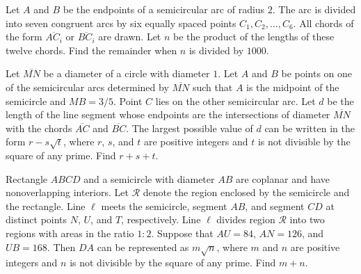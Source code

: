 %	












\begin{question}[name={2009 AIME II, \href{https://artofproblemsolving.com/community/c4p1455385}{Problem 13}}]
	Let $ A$ and $ B$ be the endpoints of a semicircular arc of radius $ 2$. The arc is divided into seven congruent arcs by six equally spaced points $ C_1,C_2,\ldots,C_6$. All chords of the form $ \overline{AC_i}$ or $ \overline{BC_i}$ are drawn. Let $ n$ be the product of the lengths of these twelve chords. Find the remainder when $ n$ is divided by $1000$.
\end{question}


%	














\begin{question}[name={2009 AIME II, \href{https://artofproblemsolving.com/community/c4p1455383}{Problem 15}}]
	Let $ \overline{MN}$ be a diameter of a circle with diameter $ 1$. Let $ A$ and $ B$ be points on one of the semicircular arcs determined by $ \overline{MN}$ such that $ A$ is the midpoint of the semicircle and $ MB=3/5$. Point $ C$ lies on the other semicircular arc. Let $ d$ be the length of the line segment whose endpoints are the intersections of diameter $ \overline{MN}$ with the chords $ \overline{AC}$ and $ \overline{BC}$. The largest possible value of $ d$ can be written in the form $ r-s\sqrt{t}$, where $ r$, $ s$, and $ t$ are positive integers and $ t$ is not divisible by the square of any prime. Find $r+s+t$.
\end{question}








\begin{question}[name={2010 AIME I, \href{https://artofproblemsolving.com/community/c4p1813791}{Problem 13}}]
	Rectangle $ ABCD$ and a semicircle with diameter $ AB$ are coplanar and have nonoverlapping interiors. Let $ \mathcal{R}$ denote the region enclosed by the semicircle and the rectangle. Line $ \ell$ meets the semicircle, segment $ AB$, and segment $ CD$ at distinct points $ N$, $ U$, and $ T$, respectively. Line $ \ell$ divides region $ \mathcal{R}$ into two regions with areas in the ratio $ 1: 2$. Suppose that $ AU = 84$, $ AN = 126$, and $ UB = 168$. Then $ DA$ can be represented as $ m\sqrt {n}$, where $ m$ and $ n$ are positive integers and $ n$ is not divisible by the square of any prime. Find $m + n$.
\end{question}


